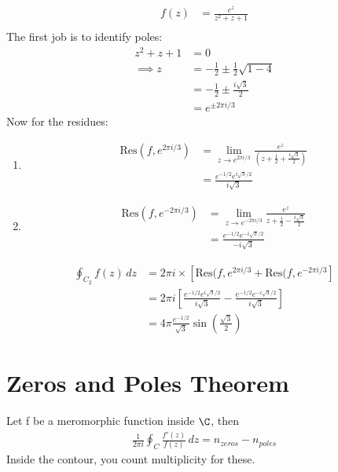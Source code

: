 \documentclass[a4paper, 11pt, normalem]{report}
\begin{document}
\begin{example}[2]
    \begin{align}
        f(z) &= \frac{e^z}{z^2 + z + 1} \\
    \end{align}
    The first job is to identify poles:
    \begin{align}
        z^2 + z + 1 &= 0 \\
        \implies z &= -\frac{1}{2} \pm \frac{1}{2} \sqrt{1-4} \\
                   &= -\frac{1}{2} \pm \frac{i\sqrt{3}}{2} \\
                   &= e^{\pm 2\pi i/3}
    \end{align}
    Now for the residues:
    \begin{enumerate}
        \item
            \begin{align}
                \text{Res}(f,e^{2\pi i/3}) &= \lim_{z\to e^{2\pi i/3}} \frac{e^z}{\left(z + \frac{1}{2} + \frac{i\sqrt{3}}{2}\right)} \\
                                           &= \frac{e^{-1/2}e^{i\sqrt{3}/2}}{i\sqrt{3}}
            \end{align}
        \item
            \begin{align}
                \text{Res}(f,e^{-2\pi i/3}) &= \lim_{z\to e^{-2\pi i/3}} \frac{e^z}{z+\frac{1}{2}-\frac{i\sqrt{3}}{2}} \\
                                            &= \frac{e^{-1/2}e^{-i\sqrt{3}/2}}{-i\sqrt{3}}
            \end{align}
    \end{enumerate}
    \begin{align}
        \oint_{C_2} f(z)\,dz &= 2\pi i \times \left[\text{Res}(f,e^{2\pi i/3} + \text{Res}(f,e^{-2\pi i/3}\right] \\
                             &= 2\pi i \left[\frac{e^{-1/2}e^{i\sqrt{3}/2}}{i\sqrt{3}} - \frac{e^{-1/2}e^{-i\sqrt{3}/2}}{i\sqrt{3}}\right] \\
                             &= 4\pi \frac{e^{-1/2}}{\sqrt{3}} \sin\left(\frac{\sqrt{3}}{2}\right)
    \end{align}
\end{example}

\section{Zeros and Poles Theorem}
Let f be a meromorphic function inside $\C$, then
\begin{align}
    \frac{1}{2\pi i}\oint_C \frac{f'(z)}{f(z)}\,dz = n_{zeros} - n_{poles}
\end{align}
Inside the contour, you count multiplicity for these.
\end{document}
